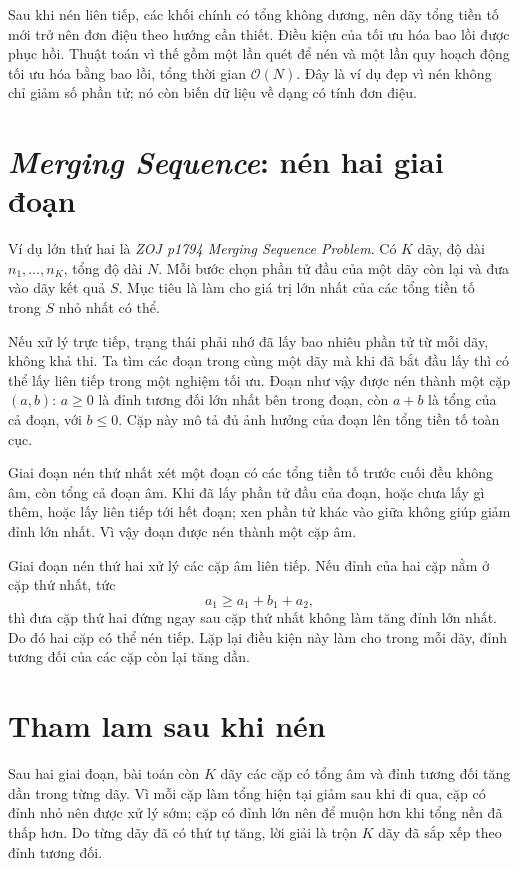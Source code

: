 \documentclass[11pt]{article}
\newcommand{\Oh}{\mathcal{O}}
\begin{document}
Sau khi nén liên tiếp, các khối chính có tổng không dương, nên dãy tổng tiền
tố mới trở nên đơn điệu theo hướng cần thiết. Điều kiện của tối ưu hóa bao
lồi được phục hồi. Thuật toán vì thế gồm một lần quét để nén và một lần quy
hoạch động tối ưu hóa bằng bao lồi, tổng thời gian \(\Oh(N)\). Đây là ví dụ
đẹp vì nén không chỉ giảm số phần tử; nó còn biến dữ liệu về dạng có tính
đơn điệu.

\section{\textit{Merging Sequence}: nén hai giai đoạn}

Ví dụ lớn thứ hai là \textit{ZOJ p1794 Merging Sequence Problem}. Có \(K\)
dãy, độ dài \(n_1,\ldots,n_K\), tổng độ dài \(N\). Mỗi bước chọn phần tử đầu
của một dãy còn lại và đưa vào dãy kết quả \(S\). Mục tiêu là làm cho giá trị
lớn nhất của các tổng tiền tố trong \(S\) nhỏ nhất có thể.

Nếu xử lý trực tiếp, trạng thái phải nhớ đã lấy bao nhiêu phần tử từ mỗi dãy,
không khả thi. Ta tìm các đoạn trong cùng một dãy mà khi đã bắt đầu lấy thì
có thể lấy liên tiếp trong một nghiệm tối ưu. Đoạn như vậy được nén thành một
cặp \((a,b)\): \(a\ge0\) là đỉnh tương đối lớn nhất bên trong đoạn, còn
\(a+b\) là tổng của cả đoạn, với \(b\le0\). Cặp này mô tả đủ ảnh hưởng của
đoạn lên tổng tiền tố toàn cục.

Giai đoạn nén thứ nhất xét một đoạn có các tổng tiền tố trước cuối đều không
âm, còn tổng cả đoạn âm. Khi đã lấy phần tử đầu của đoạn, hoặc chưa lấy gì
thêm, hoặc lấy liên tiếp tới hết đoạn; xen phần tử khác vào giữa không giúp
giảm đỉnh lớn nhất. Vì vậy đoạn được nén thành một cặp âm.

Giai đoạn nén thứ hai xử lý các cặp âm liên tiếp. Nếu đỉnh của hai cặp nằm ở
cặp thứ nhất, tức
\[
  a_1\ge a_1+b_1+a_2,
\]
thì đưa cặp thứ hai đứng ngay sau cặp thứ nhất không làm tăng đỉnh lớn nhất.
Do đó hai cặp có thể nén tiếp. Lặp lại điều kiện này làm cho trong mỗi dãy,
đỉnh tương đối của các cặp còn lại tăng dần.

\section{Tham lam sau khi nén}

Sau hai giai đoạn, bài toán còn \(K\) dãy các cặp có tổng âm và đỉnh tương
đối tăng dần trong từng dãy. Vì mỗi cặp làm tổng hiện tại giảm sau khi đi qua,
cặp có đỉnh nhỏ nên được xử lý sớm; cặp có đỉnh lớn nên để muộn hơn khi tổng
nền đã thấp hơn. Do từng dãy đã có thứ tự tăng, lời giải là trộn \(K\) dãy
đã sắp xếp theo đỉnh tương đối.
\end{document}
